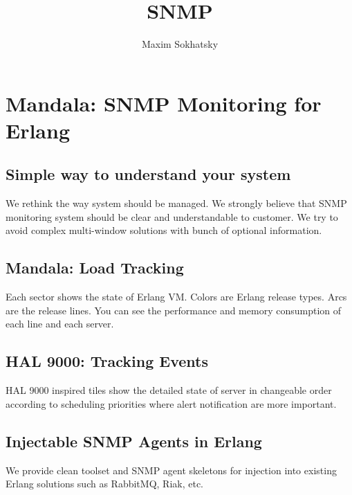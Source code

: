 \documentclass[11pt]{article}
\begin{document}
\title{SNMP}
\author{Maxim Sokhatsky}

\paragraph{}
\section*{Mandala: SNMP Monitoring for Erlang}
\subsection*{Simple way to understand your system}
We rethink the way system should be managed. We strongly believe that
SNMP monitoring system should be clear and understandable to customer.
We try to avoid complex multi-window solutions with bunch of optional information.

\subsection*{Mandala: Load Tracking}

Each sector shows the state of Erlang VM. Colors are Erlang release types.
Arcs are the release lines. You can see the performance and memory
consumption of each line and each server.

\subsection*{HAL 9000: Tracking Events}

HAL 9000 inspired tiles show the detailed state of server in changeable
order according to scheduling priorities where alert notification are more
important.

\subsection*{Injectable SNMP Agents in Erlang}
We provide clean toolset and SNMP agent skeletons for injection into existing Erlang
solutions such as RabbitMQ, Riak, etc.
\end{document}
